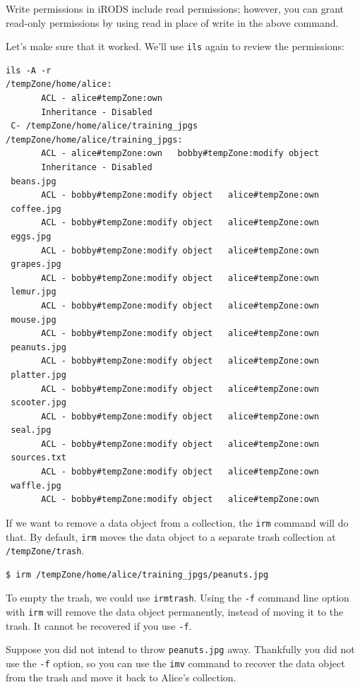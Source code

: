 \documentclass[10pt,oneside]{memoir}
\begin{document}
Write permissions in iRODS include read permissions; however, you can grant read-only permissions by using read in place of write in the above command.

Let's make sure that it worked. We'll use \texttt{ils} again to review the permissions:

\begin{lstlisting}
ils -A -r
/tempZone/home/alice:
       ACL - alice#tempZone:own
       Inheritance - Disabled
 C- /tempZone/home/alice/training_jpgs
/tempZone/home/alice/training_jpgs:
       ACL - alice#tempZone:own   bobby#tempZone:modify object
       Inheritance - Disabled
 beans.jpg
       ACL - bobby#tempZone:modify object   alice#tempZone:own
 coffee.jpg
       ACL - bobby#tempZone:modify object   alice#tempZone:own
 eggs.jpg
       ACL - bobby#tempZone:modify object   alice#tempZone:own
 grapes.jpg
       ACL - bobby#tempZone:modify object   alice#tempZone:own
 lemur.jpg
       ACL - bobby#tempZone:modify object   alice#tempZone:own
 mouse.jpg
       ACL - bobby#tempZone:modify object   alice#tempZone:own
 peanuts.jpg
       ACL - bobby#tempZone:modify object   alice#tempZone:own
 platter.jpg
       ACL - bobby#tempZone:modify object   alice#tempZone:own
 scooter.jpg
       ACL - bobby#tempZone:modify object   alice#tempZone:own
 seal.jpg
       ACL - bobby#tempZone:modify object   alice#tempZone:own
 sources.txt
       ACL - bobby#tempZone:modify object   alice#tempZone:own
 waffle.jpg
       ACL - bobby#tempZone:modify object   alice#tempZone:own
\end{lstlisting}

If we want to remove a data object from a collection, the \texttt{irm} command will do that. By default, \texttt{irm} moves the data object to a separate trash collection at \texttt{/tempZone/trash}.

\begin{lstlisting}
$ irm /tempZone/home/alice/training_jpgs/peanuts.jpg
\end{lstlisting}

To empty the trash, we could use \texttt{irmtrash}. Using the \texttt{-f} command line option with \texttt{irm} will remove the data object permanently, instead of moving it to the trash. It cannot be recovered if you use \texttt{-f}.

Suppose you did not intend to throw \texttt{peanuts.jpg} away. Thankfully you did not use the
\texttt{-f} option, so you can use the \texttt{imv} command to recover the data object from the trash and move it back to Alice's collection.
\end{document}
